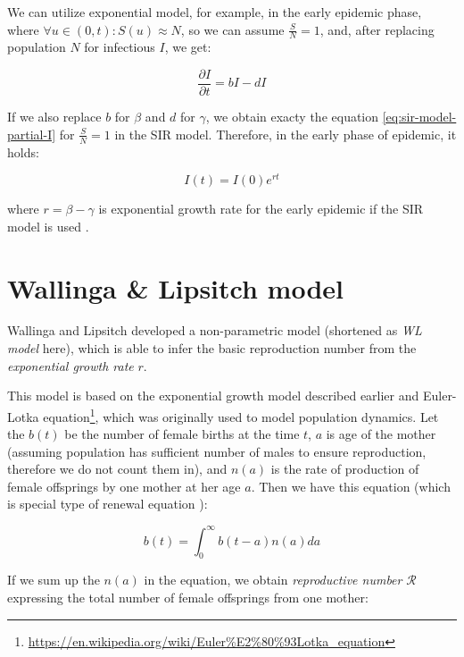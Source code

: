\documentclass[
  digital, %
  oneside, %
  lof,     %
  lot,     %
]{fithesis4}
\begin{document}
We can utilize exponential model,
for example, in the early epidemic phase,
where $\forall u \in (0, t) : S(u) \approx N$, so we can assume $\frac{S}{N} = 1$,
and, after replacing population $N$ for infectious $I$, we get:

\begin{equation}
  \frac{\partial I}{\partial t} = b I - d I
\end{equation}

If we also replace $b$ for $\beta$ and $d$ for $\gamma$, we
obtain exacty the equation \eqref{eq:sir-model-partial-I} for $\frac{S}{N} = 1$ in the SIR model.
Therefore, in the early phase of epidemic, it holds:

\begin{equation}
  I(t) = I(0) e^{rt}
\end{equation}

where $r = \beta - \gamma$ is exponential growth rate for the early epidemic
if the SIR model is used \cite{ma2019}.



\section{Wallinga \& Lipsitch model}
\label{sec:wl-model}

Wallinga and Lipsitch \cite{wallinga2007} developed a non-parametric
model (shortened as \textit{WL model} here), which is able to infer
the basic reproduction number from the \textit{exponential growth rate} $r$.

This model is based on the exponential growth model described earlier and
Euler-Lotka equation\footnote{\url{https://en.wikipedia.org/wiki/Euler\%E2\%80\%93Lotka_equation}},
which was originally used to model population dynamics.
Let the $b(t)$ be the number of female births at the time $t$, $a$ is 
age of the mother (assuming population has sufficient 
number of males to ensure reproduction, therefore we do not 
count them in), and $n(a)$ is the rate of production of female offsprings 
by one mother at her age $a$. Then we have this equation (which is 
special type of renewal equation \cite{feller1941}):

\begin{equation}\label{eq:wl-model-renewal}
  b(t) = \int_{0}^{\infty} b(t - a) n(a) da
\end{equation}

If we sum up the $n(a)$ in the equation, we obtain \textit{reproductive number} 
$\mathcal{R}$ expressing the total number of female offsprings from one mother:
\end{document}

